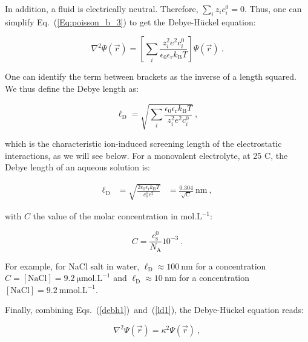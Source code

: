 In addition, a fluid is electrically neutral. Therefore, $\sum_i z_i c_i^0 = 0$. Thus, one can simplify Eq.~(\ref{Eq:poisson_b_3}) to get the Debye-Hückel equation:

\begin{equation}
	\nabla^2 \Psi (\vec{r}) = \left[  \sum_i \frac{z_i ^2 e^2 c_i^0}{\epsilon_0 \epsilon_\mathrm{r}  k_\mathrm{B} T}    \right] \Psi (\vec{r}) ~.
	\label{debh1}
\end{equation}

One can identify the term between brackets as the inverse of a length squared. We thus define the Debye length as:

\begin{equation}
	\ell _\mathrm{D} =  \sqrt{ \sum_i\frac {\epsilon_0 \epsilon_\mathrm{r} k_\mathrm{B} T} {z_i ^2 e^2 c_i^0}} ~,
	\label{ld1}
\end{equation}

which is the characteristic ion-induced screening length of the electrostatic interactions, as we will see below. For a monovalent electrolyte,  at 25 \textdegree C, the Debye length of an aqueous solution is:

\begin{equation}
	\begin{aligned}
		\ell _\mathrm{D} &= \sqrt{\frac{ 2 \epsilon_0 \epsilon_\mathrm{r} k_\mathrm{B}T}{c_s^0 e^2}}
		& = \frac{0.304 }{ \sqrt{C} } ~\mathrm{nm} ~,
	\end{aligned}
	\label{ldnacl}
\end{equation}


with $C$ the value of the molar concentration in $\mathrm{mol.L^{-1}}$:

\begin{equation}
	C = \frac{c_\mathrm{s} ^0}{N_\mathrm{A}} 10^{-3} ~. 
\end{equation}


For example, for NaCl salt in water,  $\ell_\mathrm{D} \approx 100 ~ \mathrm{nm}$ for a concentration  $C = [\mathrm{NaCl}] = 9.2 ~ \mathrm{\mu mol.L^{-1}}$ and   $\ell_\mathrm{D} \approx 10 ~  \mathrm{nm}$ for a concentration  $[\mathrm{NaCl}] = 9.2 ~ \mathrm{mmol.L^{-1}}$.



Finally, combining Eqs.~(\ref{debh1})~and~(\ref{ld1}),  the Debye-Hückel equation reads:

\begin{equation}
	\nabla^2 \Psi (\vec{r}) = \kappa^2  \Psi (\vec{r}) ~,
	\label{Eq:Debye_hu}
\end{equation}

